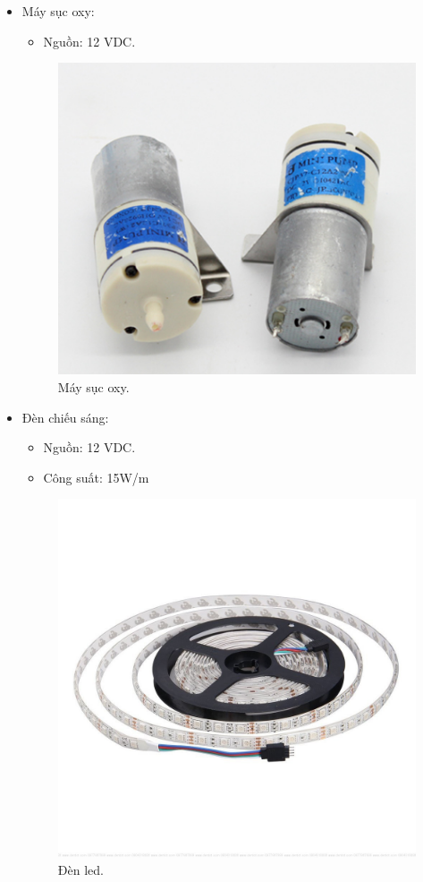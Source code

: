 \documentclass[a4paper,12pt,oneside]{article}
\begin{document}
\begin{itemize}
\item  Máy sục oxy:
\begin{itemize}
\item Nguồn: 12 VDC.
\end{itemize}
\begin{figure}[h!]
\begin{center}
\includegraphics[scale=0.7]{hinh/oxi.png}
\end{center}
\caption{Máy sục oxy.}
\end{figure}

\item Đèn chiếu sáng:
\begin{itemize}
\item Nguồn: 12 VDC. 
\item Công suất: 15W/m
\end{itemize}
\begin{figure}[h!]
\begin{center}
\includegraphics[scale=0.4]{hinh/led.jpg}
\end{center}
\caption{Đèn led.}
\end{figure}


\end{itemize}
\end{document}
